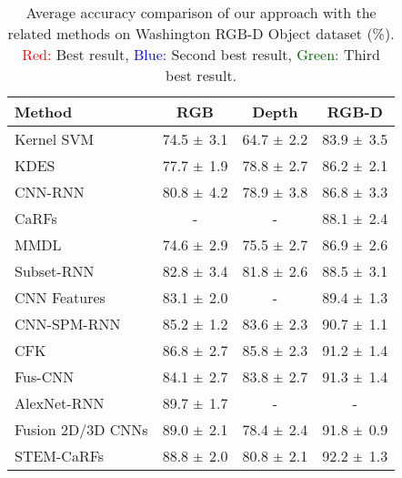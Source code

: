 \begin{table}[!h]
	\caption{Average accuracy comparison of our approach with the related methods on Washington RGB-D Object dataset (\%). \textcolor{red}{Red:} Best result, \textcolor{blue}{Blue:} Second best result, \textcolor{darkgreen}{Green:} Third best result.}
	\begin{center}
		\setlength{\tabcolsep}{0.9em} \def\arraystretch{1.1}
		\begin{adjustbox}{width=\columnwidth}
			\begin{tabular}{ lccc }
				\hline
				Method 											& RGB 							& Depth 						& RGB-D \\ \hline \hline
				Kernel SVM \citep{Lai_ICRA_2011}    				& 74.5 $\pm\hfil$ 3.1 			& 64.7 $\pm\hfil$ 2.2 	 		& 83.9 $\pm\hfil$ 3.5			\\ KDES \citep{Bo_IROS_2011}         				& 77.7 $\pm\hfil$ 1.9 			& 78.8 $\pm\hfil$ 2.7 			& 86.2 $\pm\hfil$ 2.1			\\ CNN-RNN \citep{Socher_NIPS_2012}    				& 80.8 $\pm\hfil$ 4.2 			& 78.9 $\pm\hfil$ 3.8			& 86.8 $\pm\hfil$ 3.3			\\ CaRFs \citep{Asif_ICRA_2015}         			& - 			                & - 			                & 88.1 $\pm\hfil$ 2.4			\\ MMDL \citep{Wang_2015_IEEE_ToM}         			& 74.6 $\pm\hfil$ 2.9			& 75.5 $\pm\hfil$ 2.7			& 86.9 $\pm\hfil$ 2.6			\\ Subset-RNN \citep{Bai_Neurocomp_2015}  			& 82.8 $\pm\hfil$ 3.4 			& 81.8 $\pm\hfil$ 2.6 	 		& 88.5 $\pm\hfil$ 3.1			\\ CNN Features \citep{Schwarz_ICRA_2015}  	        & 83.1 $\pm\hfil$ 2.0 			& -								& 89.4 $\pm\hfil$ 1.3			\\ CNN-SPM-RNN \citep{Cheng_CVIU_2015}        		& 85.2 $\pm\hfil$ 1.2		 	& 83.6 $\pm\hfil$ 2.3 			& 90.7 $\pm\hfil$ 1.1			\\ CFK \citep{Cheng_3DV_2015}  						& 86.8 $\pm\hfil$ 2.7 			& 85.8 $\pm\hfil$ 2.3	        & 91.2 $\pm\hfil$ 1.4			\\ Fus-CNN \citep{Eitel_IROS_2015}  	        	& 84.1 $\pm\hfil$ 2.7 			& 83.8 $\pm\hfil$ 2.7			& 91.3 $\pm\hfil$ 1.4			\\ AlexNet-RNN \citep{Bui_Access_2016}  			& 89.7 $\pm\hfil$ 1.7 			& -								& -								\\ Fusion 2D/3D CNNs \citep{Zia_ICCVW_2017}         & 89.0 $\pm\hfil$ 2.1 			& 78.4 $\pm\hfil$ 2.4			& 91.8 $\pm\hfil$ 0.9			\\ STEM-CaRFs \citep{Asif_ToR_2017}  			    & 88.8 $\pm\hfil$ 2.0 			& 80.8 $\pm\hfil$ 2.1			& 92.2 $\pm\hfil$ 1.3			\\

\end{tabular}
\end{adjustbox}
\end{center}
\end{table}
